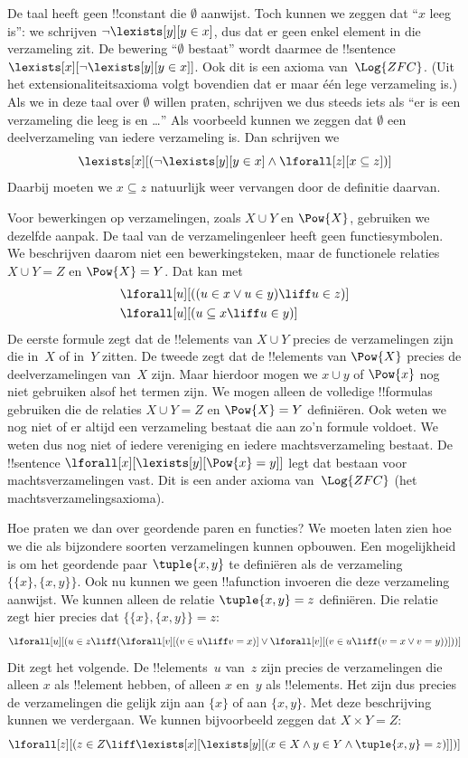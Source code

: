 \documentclass[../../../include/open-logic-section]{subfiles}
\begin{document}
De taal heeft geen !!{constant} die $\emptyset$ aanwijst. Toch kunnen
we zeggen dat ``$x$ leeg is'': we schrijven $\lnot \lexists[y][y \in
x]$, dus dat er geen enkel element in die verzameling zit. De bewering ``$\emptyset$
bestaat'' wordt daarmee de !!{sentence}~$\lexists[x][\lnot
\lexists[y][y \in x]]$. Ook dit is een axioma van~$\Log{ZFC}$.
(Uit het extensionaliteitsaxioma volgt bovendien dat er maar één lege
verzameling is.) Als we in deze taal over $\emptyset$ willen praten,
schrijven we dus steeds iets als ``er is een verzameling die leeg is en
\dots'' Als voorbeeld kunnen we zeggen dat $\emptyset$ een
deelverzameling van iedere verzameling is. Dan schrijven we
\[
\lexists[x][(\lnot\lexists[y][y \in x] \land \lforall[z][x \subseteq
    z])]
\]
Daarbij moeten we $x \subseteq z$ natuurlijk weer vervangen door de
definitie daarvan.

Voor bewerkingen op verzamelingen, zoals $X \cup Y$ en $\Pow{X}$,
gebruiken we dezelfde aanpak. De taal van de verzamelingenleer heeft
geen functiesymbolen. We beschrijven daarom niet een bewerkingsteken,
maar de functionele relaties $X \cup Y = Z$ en $\Pow{X} = Y$. Dat kan
met
\begin{align*}
& \lforall[u][((u \in x \lor u \in y) \liff u \in z)]\\
& \lforall[u][(u \subseteq x \liff u \in y )]
\end{align*}
De eerste formule zegt dat de !!{element}s van $X \cup Y$ precies de
verzamelingen zijn die in~$X$ of in~$Y$ zitten. De tweede zegt dat de
!!{element}s van $\Pow{X}$ precies de deelverzamelingen van~$X$ zijn.
Maar hierdoor mogen we $x \cup y$ of $\Pow{x}$ nog niet gebruiken alsof
het termen zijn. We mogen alleen de volledige !!{formula}s gebruiken
die de relaties $X \cup Y = Z$ en $\Pow{X} = Y$ definiëren. Ook weten
we nog niet of er altijd een verzameling bestaat die aan zo'n formule
voldoet. We weten dus nog niet of iedere vereniging en iedere
machtsverzameling bestaat. De !!{sentence}
$\lforall[x][\lexists[y][\Pow{x} = y]]$ legt dat bestaan voor
machtsverzamelingen vast. Dit is een ander axioma van~$\Log{ZFC}$ (het
machtsverzamelingsaxioma).

Hoe praten we dan over geordende paren en functies? We moeten laten
zien hoe we die als bijzondere soorten verzamelingen kunnen opbouwen.
Een mogelijkheid is om het geordende paar $\tuple{x, y}$ te definiëren
als de verzameling $\{\{x\}, \{x, y\}\}$. Ook nu kunnen we geen
!!a{function} invoeren die deze verzameling aanwijst. We kunnen alleen
de relatie $\tuple{x, y} = z$ definiëren. Die relatie zegt hier precies
dat $\{\{x\}, \{x, y\}\} = z$:
\[
\lforall[u][(u \in z \liff (\lforall[v][(v \in u \liff v = x)] \lor
  \lforall[v][(v \in u \liff (v = x \lor v = y))]))]
\]
Dit zegt het volgende. De !!{element}s~$u$ van~$z$ zijn precies de
verzamelingen die alleen $x$ als !!{element} hebben, of alleen $x$
en~$y$ als !!{element}s. Het zijn dus precies de verzamelingen die
gelijk zijn aan $\{x\}$ of aan $\{x, y\}$. Met deze beschrijving kunnen
we verdergaan. We kunnen bijvoorbeeld zeggen dat $X \times Y = Z$:
\[
\lforall[z][(z \in Z \liff \lexists[x][\lexists[y][(x \in
        X \land y \in Y \land \tuple{x, y} = z)]])]
\]
\end{document}
